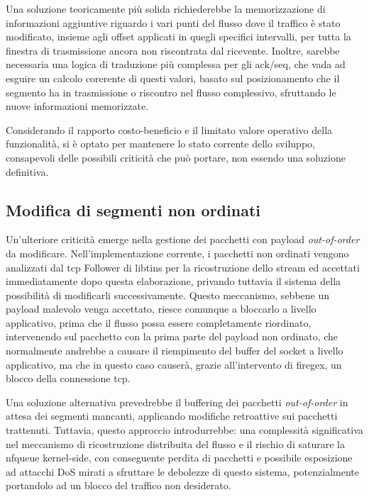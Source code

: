 Una soluzione teoricamente più solida richiederebbe la memorizzazione di informazioni aggiuntive riguardo i vari punti del flusso dove il traffico è stato modificato, insieme agli offset applicati in quegli specifici intervalli, per tutta la finestra di trasmissione ancora non riscontrata dal ricevente. Inoltre, sarebbe necessaria una logica di traduzione più complessa per gli \gls{ack}/\gls{seq}, che vada ad esguire un calcolo corerente di questi valori, basato sul posizionamento che il segmento ha in trasmissione o riscontro nel flusso complessivo, sfruttando le nuove informazioni memorizzate.

Considerando il rapporto costo-beneficio e il limitato valore operativo della funzionalità, si è optato per mantenere lo stato corrente dello sviluppo, consapevoli delle possibili criticità che può portare, non essendo una soluzione definitiva.

\subsection{Modifica di segmenti non ordinati}

Un'ulteriore criticità emerge nella gestione dei pacchetti con payload \emph{out-of-order} da modificare. Nell'implementazione corrente, i pacchetti non ordinati vengono analizzati dal \gls{tcp} Follower di libtins per la ricostruzione dello stream ed accettati immediatamente dopo questa elaborazione, privando tuttavia il sistema della possibilità di modificarli successivamente. Questo meccanismo, sebbene un payload malevolo venga accettato, riesce comunque a bloccarlo a livello applicativo, prima che il flusso possa essere completamente riordinato, intervenendo sul pacchetto con la prima parte del payload non ordinato, che normalmente andrebbe a causare il riempimento del buffer del socket a livello applicativo, ma che in questo caso causerà, grazie all'intervento di firegex, un blocco della connessione \gls{tcp}.

Una soluzione alternativa prevedrebbe il buffering dei pacchetti \emph{out-of-order} in attesa dei segmenti mancanti, applicando modifiche retroattive sui pacchetti trattenuti. Tuttavia, questo approccio introdurrebbe: una complessità significativa nel meccanismo di ricostruzione distribuita del flusso e il rischio di saturare la \gls{nfqueue} kernel-side, con conseguente perdita di pacchetti e possibile esposizione ad attacchi DoS mirati a sfruttare le debolezze di questo sistema, potenzialmente portandolo ad un blocco del traffico non desiderato.

